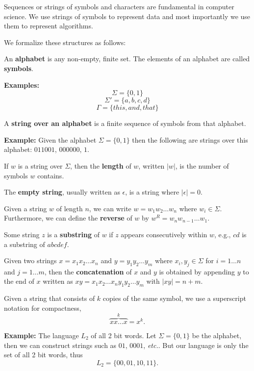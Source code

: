 \documentclass[a4paper,blends,pdf,colorBG,slideColor]{prosper}
\begin{document}
Sequences or strings of symbols and characters are fundamental in computer science.
We use strings of symbols to represent data and most importantly we use them to
represent algorithms.

We formalize these structures as follows:

An {\bf alphabet} is any non-empty, finite set. The elements of an alphabet are called {\bf symbols}.

{\bf Examples:}
\[
\Sigma = \{ 0, 1\}
\]
\[
\Sigma' = \{ a, b, c, d \}
\]
\[
\Gamma = \{ this, and, that \}
\]

A {\bf string over an alphabet} is a finite sequence of symbols from that alphabet.

{\bf Example:} Given the alphabet $\Sigma = \{0, 1\}$ then the following are
strings over this alphabet: $011001$, $000000$, $1$.
\es

If $w$ is a string over $\Sigma$, then the {\bf length} of $w$, written $|w|$, is
the number of symbols  $w$ contains.

The {\bf empty string}, usually written as $\epsilon$, is a string where $|\epsilon|=0$.

Given a string $w$ of length $n$, we can write $w = w_1  w_2\ldots w_n$ where
$w_i \in \Sigma$. Furthermore, we can define the {\bf reverse} of $w$ by
 $w^R = w_n w_{n-1}\ldots w_1$.
 
 Some string $z$ is a {\bf substring} of $w$ if $z$ appears consecutively within $w$,
 e.g., $cd$ is a substring of $abcdef$.
 
 Given two strings $x = x_1 x_2\ldots x_n$ and $y = y_1 y_2\ldots y_m$ where
 $x_i, y_j \in \Sigma$ for $i = 1\ldots n$ and $j = 1 \ldots m$, then the
 {\bf concatenation} of $x$ and $y$ is obtained by appending $y$ to the
 end of $x$ written as $xy = x_1 x_2 \ldots x_n y_1 y_2 \ldots y_m$ with $|xy| = n + m$.
 
 Given a string that consists of $k$ copies of the same symbol, we use a superscript
 notation for compactness,
 \[
\overbrace{xx\ldots x}^k = x^k.
\]

\es

\vspace{.9in}
\begin{center}
\end{center}

\es

{\bf Example:} The language $L_2$ of all 2 bit words. Let $\Sigma = \{0,1\}$ be
the alphabet, then we can construct strings such as $01$, $0001$, {\em etc.}. But
our language is only the set of all 2 bit words, thus
\[
L_2 = \{ 00, 01, 10, 11 \}.
\]
\end{document}
